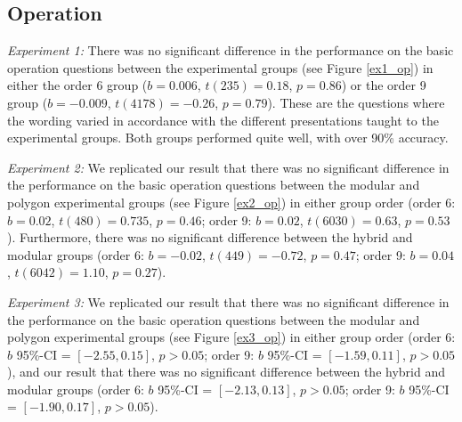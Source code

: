 \documentclass[man,10pt]{apa6}
\begin{document}
\subsection{Operation}
\textit{Experiment 1:} There was no significant difference in the performance on the basic operation questions between the experimental groups (see Figure \ref{ex1_op}) in either the order 6 group ($b = 0.006$, $t(235) = 0.18$, $p = 0.86$) or the order 9 group ($b = -0.009$, $t(4178) = -0.26$, $p = 0.79$). These are the questions where the wording varied in accordance with the different presentations taught to the experimental groups. Both groups performed quite well, with over 90\% accuracy. \par 
\textit{Experiment 2:} We replicated our result that there was no significant difference in the performance on the basic operation questions between the modular and polygon experimental groups (see Figure \ref{ex2_op}) in either group order (order 6: $b = 0.02$, $t(480) = 0.735$, $p = 0.46$; order 9: $b = 0.02$, $t(6030) = 0.63$, $p = 0.53$). Furthermore, there was no significant difference between the hybrid and modular groups (order 6: $b = -0.02$, $t(449) = -0.72$, $p = 0.47$; order 9: $b = 0.04$, $t(6042) = 1.10$, $p = 0.27$).\par
\textit{Experiment 3:} We replicated our result that there was no significant difference in the performance on the basic operation questions between the modular and polygon experimental groups (see Figure \ref{ex3_op}) in either group order (order 6: $b$ 95\%-CI = $[-2.55,0.15]$, $p > 0.05$; order 9: $b$ 95\%-CI = $[-1.59,0.11]$, $p > 0.05$), and our result that there was no significant difference between the hybrid and modular groups (order 6:  $b$ 95\%-CI = $[-2.13,0.13]$, $p > 0.05$; order 9: $b$ 95\%-CI = $[-1.90,0.17]$, $p > 0.05$). \par
\end{document}
